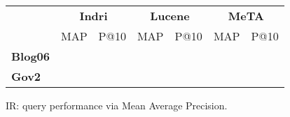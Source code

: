 \begin{figure}[t]
\centering
{\small
\begin{tabular}{|l|cc|cc|cc|}
    \hline &
    \multicolumn{2}{c|}{\textbf{Indri}} &
    \multicolumn{2}{c|}{\textbf{Lucene}} &
    \multicolumn{2}{c|}{\textbf{MeTA}} \\
    & MAP & P@10 & MAP & P@10 & MAP & P@10\\
    \hline
    \textbf{Blog06} & & & & & & \\
    \textbf{Gov2} & & & & & & \\
    \hline
\end{tabular}
\caption{IR: query performance via Mean Average Precision.}
}
\label{fig:ir-map}
\end{figure}
